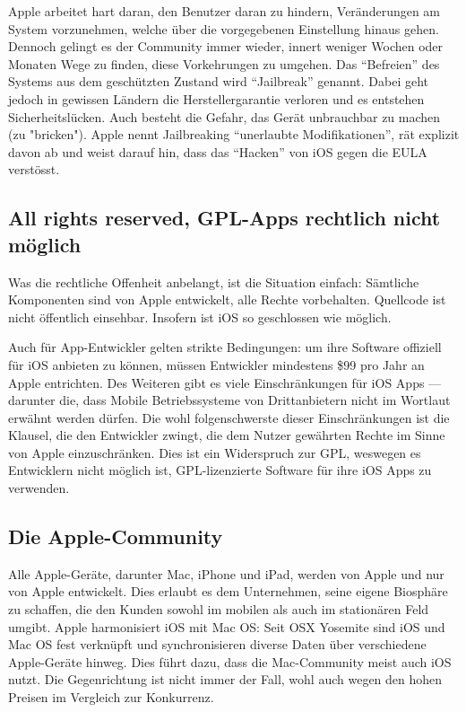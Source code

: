 Apple arbeitet hart daran, den Benutzer daran zu hindern, Veränderungen am System vorzunehmen, welche über die vorgegebenen Einstellung hinaus gehen. Dennoch gelingt es der Community immer wieder, innert weniger Wochen oder Monaten Wege zu finden, diese Vorkehrungen zu umgehen. Das ``Befreien'' des Systems aus dem geschützten Zustand wird ``Jailbreak'' genannt\thinspace\cite{online:ios-jailbreak}. Dabei geht jedoch in gewissen Ländern die Herstellergarantie verloren und es entstehen Sicherheitslücken. Auch besteht die Gefahr, das Gerät unbrauchbar zu machen (zu "bricken")\thinspace\cite{online:ios-whyjailbreak}. Apple nennt Jailbreaking ``unerlaubte Modifikationen'', rät explizit davon ab und weist darauf hin, dass das ``Hacken'' von iOS gegen die EULA verstösst\thinspace\cite{online:ios-dontjailbreak}.
\newline

\subsection{All rights reserved, GPL-Apps rechtlich nicht möglich}
Was die rechtliche Offenheit anbelangt, ist die Situation einfach: Sämtliche Komponenten sind von Apple entwickelt, alle Rechte vorbehalten. Quellcode ist nicht öffentlich einsehbar. Insofern ist iOS so geschlossen wie möglich.

Auch für \mbox{App-Entwickler} gelten strikte Bedingungen: um ihre Software offiziell für iOS anbieten zu können, müssen Entwickler mindestens \$99 pro Jahr an Apple entrichten\thinspace\cite{online:ios-appstore}. Des Weiteren gibt es viele Einschränkungen für iOS Apps --- darunter die, dass Mobile Betriebssysteme von Drittanbietern nicht im Wortlaut erwähnt werden dürfen\thinspace\cite{online:ios-guidelines}. Die wohl folgenschwerste dieser Einschränkungen ist die Klausel, die den Entwickler zwingt, die dem Nutzer gewährten Rechte im Sinne von Apple einzuschränken\thinspace\cite{online:ios-terms}. Dies ist ein Widerspruch zur GPL, weswegen es Entwicklern nicht möglich ist, \mbox{GPL-lizenzierte} Software für ihre iOS Apps zu verwenden\thinspace\cite{online:ios-gpl}. \\

\subsection{Die Apple-Community}
Alle Apple-Geräte, darunter Mac, iPhone und iPad, werden von Apple und nur von Apple entwickelt. Dies erlaubt es dem Unternehmen, seine eigene Biosphäre zu schaffen, die den Kunden sowohl im mobilen als auch im stationären Feld umgibt. Apple harmonisiert iOS mit Mac OS: Seit OS\thinspace X Yosemite sind iOS und Mac OS fest verknüpft und synchronisieren diverse Daten über verschiedene \mbox{Apple-Geräte} hinweg. Dies führt dazu, dass die \mbox{Mac-Community} meist auch iOS nutzt. Die Gegenrichtung ist nicht immer der Fall, wohl auch wegen den hohen Preisen im Vergleich zur Konkurrenz.

